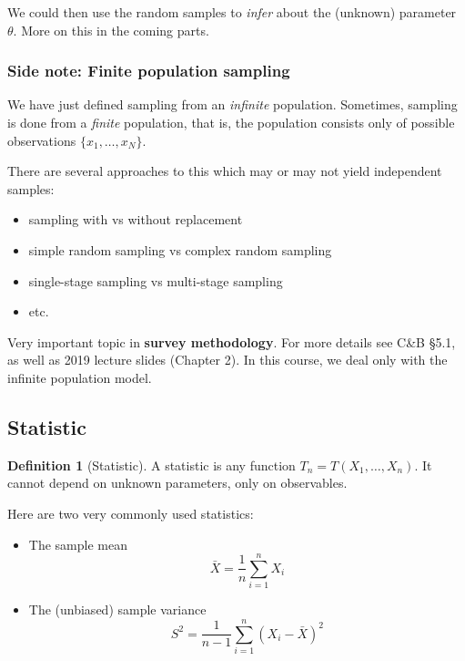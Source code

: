 \documentclass[
]{book}
\providecommand{\tightlist}{%
  \setlength{\itemsep}{0pt}\setlength{\parskip}{0pt}}
\theoremstyle{definition}
\newtheorem{definition}{Definition}[chapter]
\theoremstyle{definition}
\theoremstyle{definition}
\theoremstyle{definition}
\theoremstyle{remark}
\begin{document}
We could then use the random samples to \emph{infer} about the (unknown) parameter \(\theta\). More on this in the coming parts.

\hypertarget{side-note-finite-population-sampling}{%
\subsubsection*{Side note: Finite population sampling}\label{side-note-finite-population-sampling}}

We have just defined sampling from an \emph{infinite} population. Sometimes, sampling is done from a \emph{finite} population, that is, the population consists only of possible observations \(\{x_1,\dots,x_N \}\).

There are several approaches to this which may or may not yield independent samples:

\begin{itemize}
\tightlist
\item
  sampling with vs without replacement
\item
  simple random sampling vs complex random sampling
\item
  single-stage sampling vs multi-stage sampling
\item
  etc.
\end{itemize}

Very important topic in \textbf{survey methodology}.
For more details see C\&B §5.1, as well as 2019 lecture slides (Chapter 2).
In this course, we deal only with the infinite population model.

\hypertarget{statistic}{%
\subsection{Statistic}\label{statistic}}

\begin{definition}[Statistic]
A statistic is any function \(T_n = T(X_1,\dots,X_n)\). It cannot depend on unknown parameters, only on observables.
\end{definition}

Here are two very commonly used statistics:

\begin{itemize}
\item
  The sample mean
  \[
  \bar X = \frac{1}{n}\sum_{i=1}^n X_i
  \]
\item
  The (unbiased) sample variance
  \[
  S^2 = \frac{1}{n-1}\sum_{i=1}^n (X_i-\bar X)^2
  \]
\end{itemize}
\end{document}
